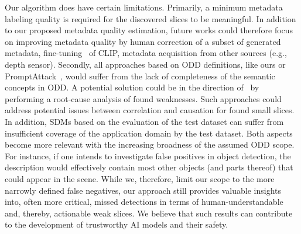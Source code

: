 Our algorithm does have certain limitations. Primarily, a minimum metadata labeling quality is required for the discovered slices to be meaningful. In addition to our proposed metadata quality estimation, future works could therefore focus on improving metadata quality by human correction of a subset of generated metadata, fine-tuning~\citep{eyuboglu2022domino} of CLIP, metadata acquisition from other sources (e.g., depth sensor).
Secondly, all approaches based on ODD definitions, like ours or PromptAttack~\citep{Metzen_2023_ICCV}, would suffer from the lack of completeness of the semantic concepts in ODD. 
A potential solution could be in the direction of~\citet{gannamaneni2024assessing} by performing a root-cause analysis of found weaknesses.
Such approaches could address potential issues between correlation and causation for found small slices.
In addition, SDMs based on the evaluation of the test dataset can suffer from insufficient coverage of the application domain by the test dataset.
Both aspects become more relevant with the increasing broadness of the assumed ODD scope. For instance, if one intends to investigate false positives in object detection, the description would effectively contain most other objects (and parts thereof) that could appear in the scene. 
While we, therefore, limit our scope to the more narrowly defined false negatives, our approach still provides valuable insights into, often more critical, missed detections in terms of human-understandable and, thereby, actionable weak slices. 
We believe that such results can contribute to the development of trustworthy AI models and their safety.


